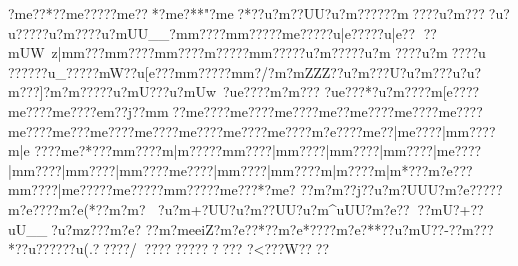 {{{{{{{{{{{{{{{{{{{{{{{{{{{{{{{{{{{{{{{{{{{{{{{{{{{{{{{{{{{{{{{{{{{{{{{{{{{{{{{{{{{{{{{{{{{{{{{{{{{{{{{{{{{{{{{{{{{{{{{{{{{{{{{{{{{{{{{{{{{{{{{{{{{{{{{{{{{{{{{{{{{{{{{{{{{{{{{{{{{{{{{{{{{{{{{{{{{{{{{{{{{{{{{{{{{{{{{{{{{{{{{{{{{{{{{{{{{{{{{{{{{{{{{{{{{{{{{{{{{{{{{{{{{{{{{{{{{{{{{{{{{{{{{{{{{{{{{{{{{{{{{{{{{{{{{{{{{{{{{{{{{{{{{{{{{{{{{{{{{{{{{{{{{{{{{{{{{{{{{{{{{{{{{{{{{{{{{{{{{{{{{{{{{{{{{{{{{{{{{{{{{{{{{{{{{{{{{{{{{{{{{{{{{{{{{{{{{{{{{{{{{{{{{{{{{{{{{{{{{{{{{{{{{{{{{{{{{{{{{{{{{{{{{{{{{{{{{{{{{{{{{{{{{{{{{{{{{{{{{{{{{{{{{{{{{{{{{{{{{{{{{{{{{{{{{{{{{{{{{{{{{{{{{{{{{{{{{{{{{{{{{{{{{{{{{{{{{{{{{{{{{{{{{{{{{{{{{{{{{{{{{{{{{{{{{{{{{{{{{{{{{{{{{{{{{{{{{{{{{{{{{{{{{{{{{{{{{{{{{{{{{{{{{{{{{{{{{{{{{{{{{{{{{{{{{{{{{{{{{{{{{{{{{{{{{{{{{{{{{{{{{{{{{{{{{{{{{{{{{{{{{{{{{{{{{{{{{{{{{{{{{{{{{{{{{{{{{{{{{{{{{{{{{{{{{{{{{{{{{{{{{{{{{{{{{{{{{{{{{{{{{{{{{{{{{{{{{{{{{{{{{{{{{{{{{{{{{{{{{{{{{{{{{{{{{{{{{{{{{{{{{{{{{{{{{{{{{{{{{{{{{{{{{{{{{{{{{{{{{{{{{{{{{{{{{{{{{{{{{{{{{{{{{{{{{{{{{{{{{{{{{{{{{{{{{{{{{{{{{{{{{{{{{{{{{{{{{{{{{{{{{{{{{{{{{{{{{{{{{{{{{{{{{{{{{{{{{{{{{{{{{{{{{{{{{{{{{{{{{{{{{{{{{{{{{{{{{{{{{{{{{{{{{{{{{{{{{{{{{{{{{{{{{{{{{{{{{{{{{{{{{{{{{{{{{{{{{{{{{{{{{{{{{{{{{{{{{{{{{{{{{{{{{{{{{{{{{{{{{{{{{{{{{{{{{{{{{{{{{{{{{{{{{{{{{{{{{{{{{{{{{{{{{{{{{{{{{{{{{{{{{{{{{{{{{{{{{{{{{{{{{{{{{{{{{{{{{{{{{{{{{{{{{{{{{{{{{{{{{{{{{{{{{{{{{{{{{{{{{{{{{{{{{{{{{{{{{{{{{{{{{{{{{{{{{{{{{{{{{{{{{{{{{{{{{{{{{{{{{{{{{{{{{{{{{{{{{{{{{{{{{{{{{{{{{{{{{{{{{{{{{{{{{{{{{{{{{{{{{{{{{{{{{{{{{{{{{{{{{{{{{{{{{{{{{{{{{{{{{{{{{{{{{{{{{{{{{{{{{{{{{{{{{{{{{{{{{{{{{{{{{{{{{{{{{{{{{{{{{{{{{{{{{{{{{{{{{{{{{{{{{{{{{{{{{{{{{{{{{{{{{{{{{{{{{{{{{{{{{{{{{{{{{{{{{{{{{{{{{{{{{{{{{{{{{{{{{{{{{{{{{{{{{{{{{{{{{{{{{{{{{{{{{{{{{{{{{{{{{{{{{{{{{{{{{{{{{{{{{{{{{{{{{{{{{{{{{{{{{{{{{{{{{{{{{{{{{{{{{{{{{{{{{{{{{{{{{{{{{{{{{{{{{{{{{{{{{{{{{{{{{{{{{{{{{{{{{{{{{{{{{{{{{{{{{{{{{{{{{{{{{{{{{{{{{{{{{{{{{{{{{{{{{{{{{{{{{{{{{{{{{{{{{{{{{{{{{{{{{{{{{{{{{{{{{{{{{{{{{{{{{{{{{{{{{{{{{{{{{{{{{{{{{{{{{{{{{{{{{{{{{{{{{{{{{{{{{{{{{{{{{{{{{{{{{{{{{{{{{{{{{{{{{{{{{{{{{{{{{{{{{{{{{{{{{{{{{{{{{{{{{{{{{{{{{{{{{{{{{{{{{{{{{{{{{{{{{{{{{{{{{{{{{{{{{{{{{{{{{{{{{{{{{{{{{{{{{{{{{{{{{{{{{{{{{{{{{{{{{{{{{{{{{{{{{{{{{{{{{{{{{{{{{{{{{{{{{{{{{{{{{{{{{{{{{{{{{{{{{{{{{{{{{{{{{{{{{{{{{{{{{{{{{{{{{{{{{{{{{{{{{{{{{{{{{{{{{{{{{{{{{{{{{{{{{{{{{{{{{{{{{{{{{{{{{{{{{{{{{{{{{{{{{{{{{{{{{{{{{{{{{{{{{{{{{{{{{{{{{{{{{{{{{{{{{{{{{{{{{{{{{{{{{{{{{{{{{{{{{{{{{{{{{{{{{{{{{{{{{{?m{e??*??m{e?????m{e??*?m{e?**"?m{e?*??u?m??UU?u?m?????}?m????u?m????u?u?????u?m????u?mUU__?m{m????m{m?????m{e?????u|e?????u|e??
?}?mUW~z|m{m???m{m????m{m????m\e?????m{m?????u?m?????u?m
????u?m ???}?u
??????u_????}?mW??u[e???m{m?????m{m?/?{m?mZZZ??u?m???U?u?m???u?u?m???]?m?m?????u?mU???u?mUw~?u{e????{m?m???%
 ?u{e???*?u?m????m[e????{m{e????{m{e????{e{m??j??m{m?}?{m{e????{m{e????{m{e????{m{e??{m{e????{m{e????{m{e????{m{e????{m{e???{m{e????{m{e????{m{e????{m{e????{m{e????{m?e????{m{e??|m{e????|m{m????{m|e
????m{e?*???m{m????{m|m?????m{m????|m{m????|m{m????|m{m????|m{e????|m{m????|m{m????|m{m????{m{e????|m{m????|m{m????{m|m????{m|m*???{m?e???m{m????|m{e?????m{e?????m{m?????m{e???*?m{e?
? ?m?m??j??u?m?UUU?m?e?????m?e ????m?e (*??m?m?
?u?m+?UU?u?m??UU?u?m^uUU?m?e???}?mU?+??uU__?u?mz???m?e?  ??m?meeiZ?m?e??*??m?e*????m?e?**??u?mU??-?}?m???*?}?u?????}?u (.???}??/??}????}???????
?<???W?? ??}}}}}}}}}}}}}}}}}}}}}}}}}}}}}}}}}}}}}}}}}}}}}}}}}}}}}}}}}}}}}}}}}}}}}}}}}}}}}}}}}}}}}}}}}}}}}}}}}}}}}}}}}}}}}}}}}}}}}}}}}}}}}}}}}}}}}}}}}}}}}}}}}}}}}}}}}}}}}}}}}}}}}}}}}}}}}}}}}}}}}}}}}}}}}}}}}}}}}}}}}}}}}}}}}}}}}}}}}}}}}}}}}}}}}}}}}}}}}}}}}}}}}}}}}}}}}}}}}}}}}}}}}}}}}}}}}}}}}}}}}}}}}}}}}}}}}}}}}}}}}}}}}}}}}}}}}}}}}}}}}}}}}}}}}}}}}}}}}}}}}}}}}}}}}}}}}}}}}}}}}}}}}}}}}}}}}}}}}}}}}}}}}}}}}}}}}}}}}}}}}}}}}}}}}}}}}}}}}}}}}}}}}}}}}}}}}}}}}}}}}}}}}}}}}}}}}}}}}}}}}}}}}}}}}}}}}}}}}}}}}}}}}}}}}}}}}}}}}}}}}}}}}}}}}}}}}}}}}}}}}}}}}}}}}}}}}}}}}}}}}}}}}}}}}}}}}}}}}}}}}}}}}}}}}}}}}}}}}}}}}}}}}}}}}}}}}}}}}}}}}}}}}}}}}}}}}}}}}}}}}}}}}}}}}}}}}}}}}}}}}}}}}}}}}}}}}}}}}}}}}}}}}}}}}}}}}}}}}}}}}}}}}}}}}}}}}}}}}}}}}}}}}}}}}}}}}}}}}}}}}}}}}}}}}}}}}}}}}}}}}}}}}}}}}}}}}}}}}}}}}}}}}}}}}}}}}}}}}}}}}}}}}}}}}}}}}}}}}}}}}}}}}}}}}}}}}}}}}}}}}}}}}}}}}}}}}}}}}}}}}}}}}}}}}}}}}}}}}}}}}}}}}}}}}}}}}}}}}}}}}}}}}}}}}}}}}}}}}}}}}}}}}}}}}}}}}}}}}}}}}}}}}}}}}}}}}}}}}}}}}}}}}}}}}}}}}}}}}}}}}}}}}}}}}}}}}}}}}}}}}}}}}}}}}}}}}}}}}}}}}}}}}}}}}}}}}}}}}}}}}}}}}}}}}}}}}}}}}}}}}}}}}}}}}}}}}}}}}}}}}}}}}}}}}}}}}}}}}}}}}}}}}}}}}}}}}}}}}}}}}}}}}}}}}}}}}}}}}}}}}}}}}}}}}}}}}}}}}}}}}}}}}}}}}}}}}}}}}}}}}}}}}}}}}}}}}}}}}}}}}}}}}}}}}}}}}}}}}}}}}}}}}}}}}}}}}}}}}}}}}}}}}}}}}}}}}}}}}}}}}}}}}}}}}}}}}}}}}}}}}}}}}}}}}}}}}}}}}}}}}}}}}}}}}}}}}}}}}}}}}}}}}}}}}}}}}}}}}}}}}}}}}}}}}}}}}}}}}}}}}}}}}}}}}}}}}}}}}}}}}}}}}}}}}}}}}}}}}}}}}}}}}}}}}}}}}}}}}}}}}}}}}}}}}}}}}}}}}}}}}}}}}}}}}}}}}}}}}}}}}}}}}}}}}}}}}}}}}}}}}}}}}}}}}}}}}}}}}}}}}}}}}}}}}}}}}}}}}}}}}}}}}}}}}}}}}}}}}}}}}}}}}}}}}}}}}}}}}}}}}}}}}}}}}}}}}}}}}}}}}}}}}}}}}}}}}}}}}}}}}}}}}}}}}}}}}}}}}}}}}}}}}}}}}}}}}}}}}}}}}}}}}}}}}}}}}}}}}}}}}}}}}}}}}}}}}}}}}}}}}}}}}}}}}}}}}}}}}}}}}}}}}}}}}}}}}}}}}}}}}}}}}}}}}}}}}}}}}}}}}}}}}}}}}}}}}}}}}}}}}}}}}}}}}}}}}}}}}}}}}}}}}}}}}}}}}}}}}}}}}}}}}}}}}}}}}}}}}}}}}}}}}}}}}}}}}}}}}}}}}}}}}}}}}}}}}}}}}}}}}}}}}}}}}}}}}}}}}}}}}}}}}}}}}}}}}}}}}}}}}}}}}}}}}}}}}}}}}}}}}}}}}}}}}}}}}}}}}}}}}}}}}}}}}}}}}}}}}}}}}}}}}}}}}}}}}}}}}}}}}}}}}}}}}}}}}}}}}}}}}}}}}}}}}}}}}}}}}}}}}}}}}}}}}}}}}}}}}}}}}}}}}}}}}}}}}}}}}}}}}}}}}}}}}}}}}}}}}}}}}}}}}}}}}}}}}}}}}}}}}}}}}}}}}}}}}}}}}}}}}}}}}}}}}}}}}}}}}}}}}}}}}}}}}}}}}}}}}}}}}}}}}}}}}}}}}}}}}}}}}}}}}}}}}}}}}}}}}}}}}}}}}}}}}}}}}}}}}}}}}}}}}}}}}}}}}}}}}}}}}}}}}}}}}}}}}}}}}}}}}}}}}}}}}}}}}}}}}}}}}}}}}}}}}}}}}}}}}}}}}}}}}}}}}}}}}}}}}}}}}}}}}}}}}}}}}}}}}}}}}}}}}}}}}}}}}}}}}}}}}}}}}}}}}}}}}}}}}}}}}}}}}}}}}}}}}}}}}}}}}}}}}}}}}}}}}}}}}}}}}}}}}}}}}}}}}}}}}}}}}}}}}}}}}}}}}}}}}}}}}}}}}}}}}}}}}}}}}}}}}}}}}}}}}}}
